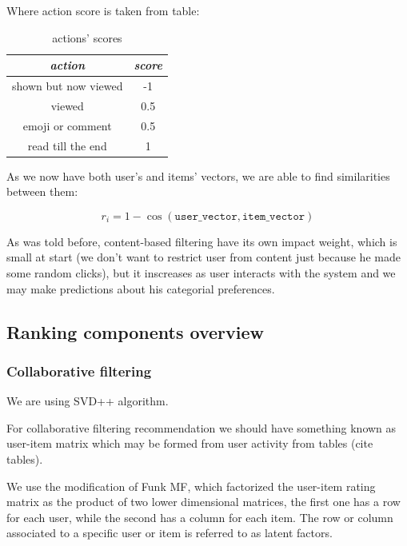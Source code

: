 \documentclass{article}
\begin{document}
Where action score is taken from table:

\begin{table}[h]
    \centering
    \begin{tabular}{cc}
        \toprule
        \textit{action} & \textit{score} \\
        \midrule
        shown but now viewed & -1 \\
        viewed & 0.5 \\
        emoji or comment & 0.5 \\
        read till the end & 1 \\
        \bottomrule
    \end{tabular}%
    \caption{actions' scores}
    \label{tab:action_score}
\end{table}

As we now have both user's and items' vectors, we are able to find similarities between them:

\begin{equation}
    r_i = 1 - \cos{(\texttt{user\_vector}, \texttt{item\_vector})}
\end{equation}


As was told before, content-based filtering have its own impact weight, which is small at start (we don't want to restrict user from content just because he made some random clicks), but it inscreases as user interacts with the system and we may make predictions about his categorial preferences.

\subsection{Ranking components overview}



\subsubsection{Collaborative filtering}

We are using SVD++ algorithm.

For collaborative filtering recommendation we should have something known as user-item matrix which may be formed from user activity from tables (cite tables).

We use the modification of Funk MF, which factorized the user-item rating matrix as the product of two lower dimensional matrices, the first one has a row for each user, while the second has a column for each item. The row or column associated to a specific user or item is referred to as latent factors.
\end{document}
